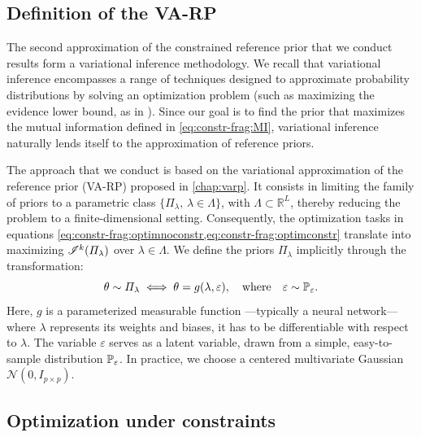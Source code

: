 \subsection{Definition of the VA-RP}\label{sec:constr-frags:subsec:varpdef}

The second approximation of the constrained reference prior that we conduct results form a variational inference methodology.
We recall that
variational inference encompasses a range of techniques designed to approximate probability distributions by solving an optimization problem (such as maximizing the evidence lower bound, as in \cite{kingma_auto-encoding_2014}). 
Since our goal is to find
the prior that maximizes the mutual information defined in \cref{eq:constr-frag:MI}, variational inference naturally lends itself to the approximation of reference priors.  

The approach that we conduct is based on the variational approximation of the reference prior (VA-RP) proposed in   \cref{chap:varp}.
It consists in limiting the family of priors to a parametric class $\{\varPi_\lambda,\,\lambda\in\Lambda\}$, with $\Lambda\subset\mathbb{R}^L$, thereby reducing the problem to a finite-dimensional setting. Consequently, the optimization tasks in equations \cref{eq:constr-frag:optimnoconstr,eq:constr-frag:optimconstr} %
translate into maximizing $\mathscr{I}^k(\varPi_\lambda)$ over $\lambda\in\Lambda$. We define the priors $\varPi_\lambda$ implicitly through the transformation:
\begin{equation}
    \theta \sim \varPi_{\lambda} \iff \theta = g(\lambda,\varepsilon), \quad \text{where} \quad \varepsilon \sim \mathbb{P}_{\varepsilon}.
\end{equation}
Here, $g$ is a parameterized measurable function ---typically a neural network--- where $\lambda$ represents its weights and biases, it has to be differentiable with respect to $\lambda$. The variable $\varepsilon$ serves as a latent variable, drawn from a simple, easy-to-sample distribution $\mathbb{P}_\varepsilon$. In practice, we choose a centered multivariate Gaussian $\mathcal{N}(0,I_{p\times p})$.  














\subsection{Optimization under constraints}\label{sec:constr-frags:subsec:optim}


